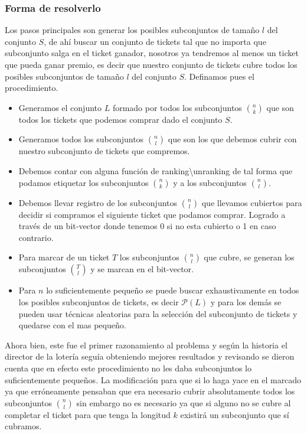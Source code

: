 \documentclass[12pt]{article}
\begin{document}
    \subsubsection{Forma de resolverlo}
    Los pasos principales son generar los posibles subconjuntos de tamaño $l$ del conjunto $S$, de ahí buscar un conjunto de tickets tal que no importa que subconjunto salga en el ticket ganador, nosotros ya tendremos al menos un ticket que pueda ganar premio, es decir que nuestro conjunto de tickets cubre todos los posibles subconjuntos de tamaño $l$ del conjunto $S$. Definamos pues el procedimiento.
    \begin{itemize}
    	\item Generamos el conjunto $L$ formado por  todos los subconjuntos  ${n}\choose{k}$ que son todos los tickets que podemos comprar dado el conjunto $S$. 
    	\item Generamos todos los subconjuntos ${n}\choose{l}$ que son los que debemos cubrir con nuestro subconjunto de tickets que compremos.
    	\item Debemos contar con alguna función de ranking\textbackslash unranking de tal forma que podamos etiquetar los subconjuntos ${n}\choose{k}$ y a los subconjuntos ${n}\choose{l}$.
    	\item Debemos llevar registro de los subconjuntos ${n}\choose{l}$ que llevamos cubiertos para decidir si compramos el siguiente ticket que podamos comprar. Logrado a través de un bit-vector donde tenemos 0 si no esta cubierto o 1 en caso contrario.
    	\item Para marcar de un ticket $T$ los subconjuntos ${n}\choose{l}$ que cubre, se generan los subconjuntos ${T}\choose{l}$ y se marcan en el bit-vector.
    	\item Para $n$ lo suficientemente pequeño se puede buscar exhaustivamente en todos los posibles subconjuntos de tickets, es decir $\mathcal{P}(L)$ y para los demás se pueden usar técnicas aleatorias para la selección del subconjunto de tickets y quedarse con el mas pequeño.
    \end{itemize}
Ahora bien, este fue el primer razonamiento al problema y según la historia el director de la lotería seguía obteniendo mejores resultados y revisando se dieron cuenta que en efecto este procedimiento no les daba subconjuntos lo suficientemente pequeños. La modificación para que si lo haga yace en el marcado ya que erróneamente pensaban que era necesario cubrir absolutamente todos los subconjuntos ${n}\choose{l}$ sin embargo no es necesario ya que si alguno no se cubre al completar el ticket para que tenga la longitud $k$ existirá un subconjunto que sí cubramos.
\end{document}
